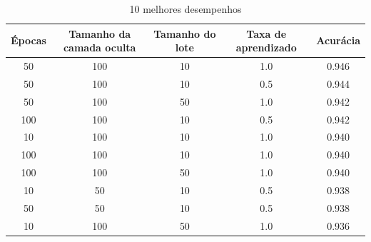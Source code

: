 \documentclass{article}
\begin{document}
\begin{table}[H]
    \centering
        \captionsetup{labelformat=empty} 
        \caption{10 melhores desempenhos}
        \begin{tabular}{| c c c c c |}
        \hline
        Épocas & Tamanho da camada oculta & Tamanho do lote & Taxa de aprendizado & Acurácia \\
        \hline
            50 & 100 & 10 & 1.0 & 0.946 \\
            50 & 100 & 10 & 0.5 & 0.944 \\
            50 & 100 & 50 & 1.0 & 0.942 \\
            100 & 100 & 10 & 0.5 & 0.942 \\
            10 & 100 & 10 & 1.0 & 0.940 \\
            100 & 100 & 10 & 1.0 & 0.940 \\
            100 & 100 & 50 & 1.0 & 0.940 \\
            10 &  50 & 10 & 0.5 & 0.938 \\
            50 &  50 & 10 & 0.5 & 0.938 \\
            10 & 100 & 50 & 1.0 & 0.936 \\
        \hline
        \end{tabular}
\end{table}
\end{document}
